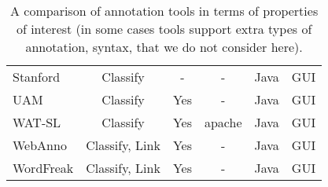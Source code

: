 \begin{table*}
\begin{tabular}{lccccc}
    Stanford \citep{stanford} & Classify & - & - & Java & GUI \\
    UAM \citep{uam} & Classify & Yes & - & Java & GUI \\
    WAT-SL \citep{wat-sl} & Classify & Yes & apache & Java & GUI \\
    WebAnno \citep{webanno} & Classify, Link & Yes & - & Java & GUI \\
    WordFreak	\citep{wordfreak} & Classify, Link & Yes & - & Java & GUI \\
    \bottomrule
  \end{tabular}
  \caption{\label{tab:comparison}
  A comparison of annotation tools in terms of properties of interest (in some cases tools support extra types of annotation, \myeg syntax, that we do not consider here).
  }
\end{table*}
